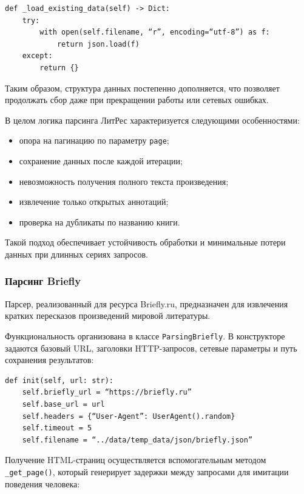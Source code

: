 \documentclass[coursework]{SCWorks}
\begin{document}
    \begin{verbatim}
def _load_existing_data(self) -> Dict:
    try:
        with open(self.filename, “r”, encoding=“utf-8”) as f:
            return json.load(f)
    except:
        return {}
    \end{verbatim}

    Таким образом, структура данных постепенно дополняется, что позволяет продолжать сбор даже при прекращении работы или сетевых ошибках.

    В целом логика парсинга ЛитРес характеризуется следующими особенностями:

    \begin{itemize}
        \item опора на пагинацию по параметру \texttt{page};
        \item сохранение данных после каждой итерации;
        \item невозможность получения полного текста произведения;
        \item извлечение только открытых аннотаций;
        \item проверка на дубликаты по названию книги.
    \end{itemize}

    Такой подход обеспечивает устойчивость обработки и минимальные потери данных при длинных сериях запросов.

    \subsubsection{Парсинг Briefly}

    Парсер, реализованный для ресурса Briefly.ru, предназначен для извлечения кратких пересказов произведений мировой литературы.

    Функциональность организована в классе \texttt{ParsingBriefly}.
    В конструкторе задаются базовый URL, заголовки HTTP-запросов, сетевые параметры и путь сохранения результатов:

    \begin{verbatim}
def init(self, url: str):
    self.briefly_url = “https://briefly.ru”
    self.base_url = url
    self.headers = {“User-Agent”: UserAgent().random}
    self.timeout = 5
    self.filename = “../data/temp_data/json/briefly.json”
    \end{verbatim}

    Получение HTML-страниц осуществляется вспомогательным методом \\ \texttt{\_get\_page()}, который генерирует задержки между
    запросами для имитации поведения человека:
\end{document}
